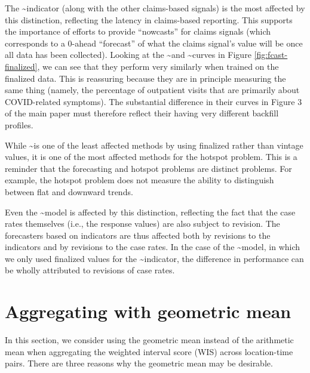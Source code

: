 \documentclass[9pt,twoside,lineno]{pnas-new}
\begin{document}
The \chngcli\textasciitilde indicator (along with the other claims-based
signals) is the most affected by this distinction, reflecting the
latency in claims-based reporting. This supports the importance of
efforts to provide ``nowcasts'' for claims signals (which corresponds to
a 0-ahead ``forecast'' of what the claims signal's value will be once
all data has been collected). Looking at the \chngcli\textasciitilde and
\dv\textasciitilde curves in Figure \ref{fig:fcast-finalized}, we can
see that they perform very similarly when trained on the finalized data.
This is reassuring because they are in principle measuring the same
thing (namely, the percentage of outpatient visits that are primarily
about COVID-related symptoms). The substantial difference in their
curves in Figure 3 of the main paper must therefore reflect their having
very different backfill profiles.

While \dv\textasciitilde is one of the least affected methods by using
finalized rather than vintage values, it is one of the most affected
methods for the hotspot problem. This is a reminder that the forecasting
and hotspot problems are distinct problems. For example, the hotspot
problem does not measure the ability to distinguish between flat and
downward trends.

Even the \ar\textasciitilde model is affected by this distinction,
reflecting the fact that the case rates themselves (i.e., the response
values) are also subject to revision. The forecasters based on
indicators are thus affected both by revisions to the indicators and by
revisions to the case rates. In the case of the
\gs\textasciitilde model, in which we only used finalized values for the
\gs\textasciitilde indicator, the difference in performance can be
wholly attributed to revisions of case rates.

\hypertarget{aggregating-with-geometric-mean}{%
\section{Aggregating with geometric
mean}\label{aggregating-with-geometric-mean}}

In this section, we consider using the geometric mean instead of the
arithmetic mean when aggregating the weighted interval score (WIS)
across location-time pairs. There are three reasons why the geometric
mean may be desirable.
\end{document}
